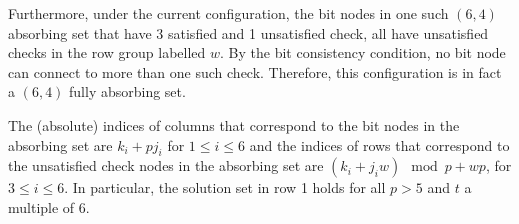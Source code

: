 Furthermore, under the current configuration, the bit nodes in one
such $(6,4)$ absorbing set that have 3 satisfied and 1 unsatisfied
check, all have unsatisfied checks in the row group labelled $w$. By
the bit consistency condition, no bit node can connect to more than
one such check. Therefore, this configuration is in fact a $(6,4)$
fully absorbing set.

The (absolute) indices of columns that correspond to the bit nodes
in the absorbing set are $k_i+pj_i$ for $1 \leq i \leq 6$ and the
indices of rows that correspond to the unsatisfied check nodes in
the absorbing set are $(k_i+j_iw) \mod p+ wp$, for $3\leq i \leq
6$. In particular, the solution set in row 1 holds for all $p > 5$
and $t$ a multiple of $6$.

